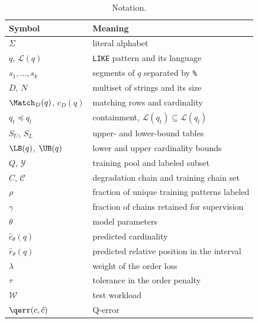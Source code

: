 \begin{table}[t]
 \centering
 \caption{Notation.}
 \label{tab:notation}
 \small
 \begin{tabular}{@{}ll@{}}
 \toprule
 Symbol & Meaning \\
 \midrule
 $\Sigma$ & literal alphabet \\
 $q$, $\mathcal{L}(q)$ & \texttt{LIKE} pattern and its language \\
 $s_1,\dots,s_k$ & segments of $q$ separated by \texttt{\%} \\
 $D$, $N$ & multiset of strings and its size \\
 $\Match_D(q)$, $c_D(q)$ & matching rows and cardinality \\
 $q_t\preceq q_l$ & containment, $\mathcal{L}(q_t)\subseteq\mathcal{L}(q_l)$ \\
 $S_U$, $S_L$ & upper- and lower-bound tables \\
 $\LB(q)$, $\UB(q)$ & lower and upper cardinality bounds \\
 $Q$, $\mathcal{Y}$ & training pool and labeled subset \\
 $C$, $\mathcal{C}$ & degradation chain and training chain set \\
 $\rho$ & fraction of unique training patterns labeled \\
 $\gamma$ & fraction of chains retained for supervision \\
 $\theta$ & model parameters \\
 $\hat c_\theta(q)$ & predicted cardinality \\
 $\hat r_\theta(q)$ & predicted relative position in the interval \\
 $\lambda$ & weight of the order loss \\
 $\tau$ & tolerance in the order penalty \\
 $\mathcal{W}$ & test workload \\
 $\qerr(c,\hat c)$ & Q-error \\
 \bottomrule
 \end{tabular}
\end{table}
